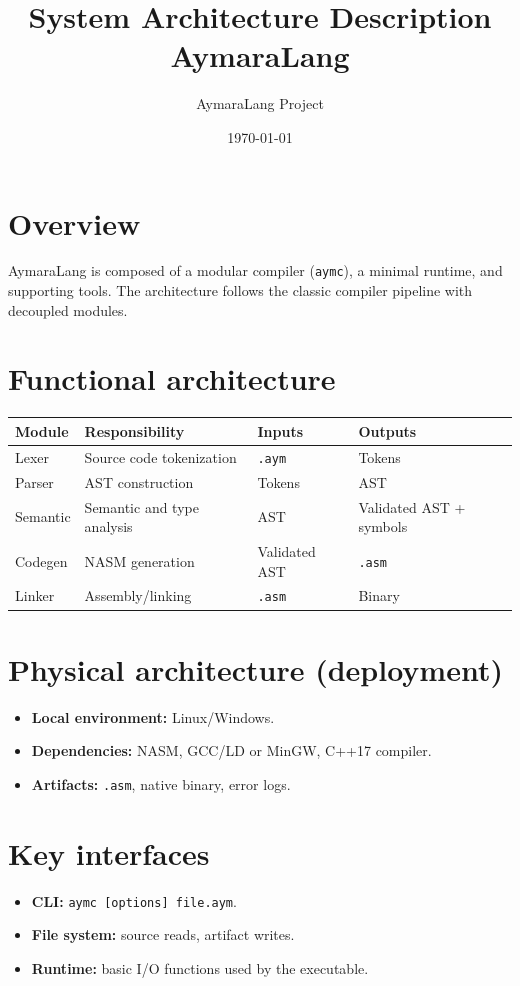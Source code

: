 \documentclass[11pt,a4paper]{article}
\title{System Architecture Description\\AymaraLang}
\author{AymaraLang Project}
\date{\today}
\begin{document}
\maketitle

\section{Overview}
AymaraLang is composed of a modular compiler (\texttt{aymc}), a minimal runtime, and supporting tools. The architecture follows the classic compiler pipeline with decoupled modules.

\section{Functional architecture}
\begin{longtable}{@{}p{3cm}p{4cm}p{4cm}p{4cm}@{}}
\toprule
\textbf{Module} & \textbf{Responsibility} & \textbf{Inputs} & \textbf{Outputs} \\ \midrule
Lexer & Source code tokenization & \texttt{.aym} & Tokens \\
Parser & AST construction & Tokens & AST \\
Semantic & Semantic and type analysis & AST & Validated AST + symbols \\
Codegen & NASM generation & Validated AST & \texttt{.asm} \\
Linker & Assembly/linking & \texttt{.asm} & Binary \\
\bottomrule
\end{longtable}

\section{Physical architecture (deployment)}
\begin{itemize}
    \item \textbf{Local environment:} Linux/Windows.
    \item \textbf{Dependencies:} NASM, GCC/LD or MinGW, C++17 compiler.
    \item \textbf{Artifacts:} \texttt{.asm}, native binary, error logs.
\end{itemize}

\section{Key interfaces}
\begin{itemize}
    \item \textbf{CLI:} \texttt{aymc [options] file.aym}.
    \item \textbf{File system:} source reads, artifact writes.
    \item \textbf{Runtime:} basic I/O functions used by the executable.
\end{itemize}
\end{document}
